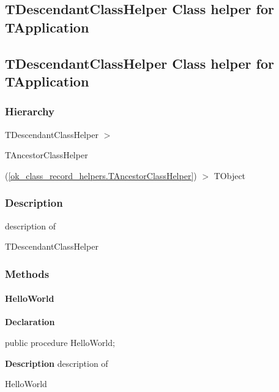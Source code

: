 \documentclass{report}
\newif\ifpdf
\begin{document}
\subsection*{\large{\textbf{TDescendantClassHelper Class helper for TApplication}}\normalsize\hspace{1ex}\hrulefill}
\else
\subsection*{TDescendantClassHelper Class helper for TApplication}
\fi
\label{ok_class_record_helpers.TDescendantClassHelper}
\subsubsection*{\large{\textbf{Hierarchy}}\normalsize\hspace{1ex}\hfill}
TDescendantClassHelper {$>$} \begin{ttfamily}TAncestorClassHelper\end{ttfamily}(\ref{ok_class_record_helpers.TAncestorClassHelper}) {$>$} 
TObject
\subsubsection*{\large{\textbf{Description}}\normalsize\hspace{1ex}\hfill}
description of \begin{ttfamily}TDescendantClassHelper\end{ttfamily}\subsubsection*{\large{\textbf{Methods}}\normalsize\hspace{1ex}\hfill}
\paragraph*{HelloWorld}\hspace*{\fill}

\label{ok_class_record_helpers.TDescendantClassHelper-HelloWorld}
\begin{list}{}{
\setlength{\itemindent}{0cm}
\setlength{\listparindent}{0cm}
\setlength{\leftmargin}{\evensidemargin}
\addtolength{\leftmargin}{\tmplength}
\settowidth{\labelsep}{X}
\addtolength{\leftmargin}{\labelsep}
\setlength{\labelwidth}{\tmplength}
}
\item[\textbf{Declaration}\hfill]
\ifpdf
\begin{flushleft}
\fi
\begin{ttfamily}
public procedure HelloWorld;\end{ttfamily}

\ifpdf
\end{flushleft}
\fi

\par
\item[\textbf{Description}]
description of \begin{ttfamily}HelloWorld\end{ttfamily}

\end{list}
\end{document}
